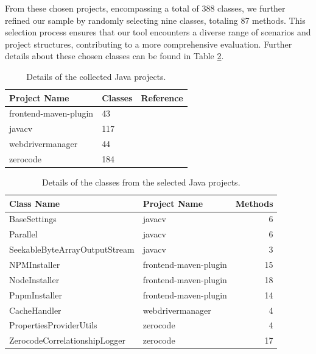 From these chosen projects, encompassing a total of 388 classes, we further refined our sample by randomly selecting nine classes, totaling 87 methods. This selection process ensures that our tool encounters a diverse range of scenarios and project structures, contributing to a more comprehensive evaluation. Further details about these chosen classes can be found in Table \ref{tab:selected_java_projects}.

\begin{table}[htbp]
    \centering
    \begin{tabular}{l | l | r}
        \textbf{Project Name} & \textbf{Classes} & \textbf{Reference} \\
        \hline
        frontend-maven-plugin & 43 & \cite{sletteberg_frontend-maven-plugin_2023} \\
        javacv & 117 & \cite{noauthor_bytedecojavacv_nodate} \\
        webdrivermanager & 44 & \cite{noauthor_bonigarciawebdrivermanager_nodate} \\
        zerocode & 184 & \cite{noauthor_authorjappszerocode_nodate} \\
    \end{tabular}
\caption{Details of the collected Java projects.}
\label{tab:collected_java_projects}
\end{table}

\begin{table}
    \centering    
    \begin{tabular}{l | l | r}
        \textbf{Class Name} & \textbf{Project Name} & \textbf{Methods} \\
        \hline
        BaseSettings & javacv & 6 \\
        Parallel & javacv & 6 \\
        SeekableByteArrayOutputStream & javacv & 3 \\
        NPMInstaller & frontend-maven-plugin & 15 \\
        NodeInstaller & frontend-maven-plugin & 18 \\
        PnpmInstaller & frontend-maven-plugin & 14 \\
        CacheHandler & webdrivermanager & 4 \\
        PropertiesProviderUtils & zerocode & 4 \\
        ZerocodeCorrelationshipLogger & zerocode & 17 \\
    \end{tabular}
\caption{Details of the classes from the selected Java projects.}
\label{tab:selected_java_projects}
\end{table}

